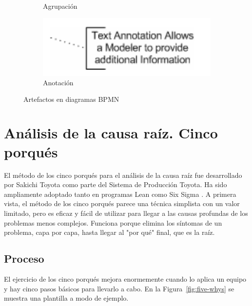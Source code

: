\begin{figure}[H]
\begin{subfigure}[b]{0.3\textwidth}
        \caption{Agrupación}
    \end{subfigure}
    \hfill
    \begin{subfigure}[b]{0.4\textwidth}
        \centering
        \includegraphics[width=\textwidth]{img/bpmn-note.png}
        \caption{Anotación}
    \end{subfigure}
    \caption{Artefactos en diagramas BPMN}
    \label{fig:bpmn-artifacts}
\end{figure}


\section{Análisis de la causa raíz. Cinco porqués}

El método de los cinco porqués para el análisis de la causa raíz fue desarrollado por Sakichi Toyota como parte del Sistema de Producción Toyota.
Ha sido ampliamente adoptado tanto en programas Lean como Six Sigma \cite{tarantino_smart_2022}.
A primera vista, el método de los cinco porqués parece una técnica simplista con un valor limitado, pero es eficaz y fácil de utilizar para llegar a las causas profundas de los problemas menos complejos.
Funciona porque elimina los síntomas de un problema, capa por capa, hasta llegar al "por qué" final, que es la raíz.

\subsection{Proceso}

El ejercicio de los cinco porqués mejora enormemente cuando lo aplica un equipo y hay cinco pasos básicos para llevarlo a cabo. En la Figura~\ref{fig:five-whys} se muestra una plantilla a modo de ejemplo.

